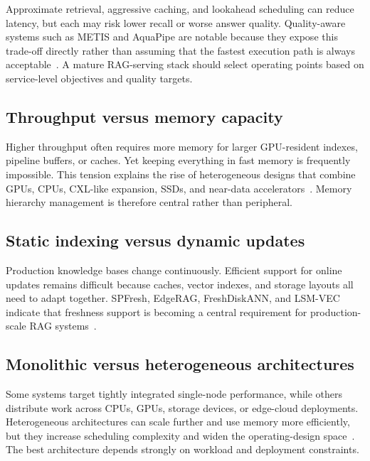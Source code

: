\documentclass[acmsmall,screen]{acmart}
\begin{document}
Approximate retrieval, aggressive caching, and lookahead scheduling can reduce latency, but each may risk lower recall or worse answer quality. Quality-aware systems such as METIS and AquaPipe are notable because they expose this trade-off directly rather than assuming that the fastest execution path is always acceptable~\cite{metis2025,aquapipe2025}. A mature RAG-serving stack should select operating points based on service-level objectives and quality targets.

\subsection{Throughput versus memory capacity}

Higher throughput often requires more memory for larger GPU-resident indexes, pipeline buffers, or caches. Yet keeping everything in fast memory is frequently impossible. This tension explains the rise of heterogeneous designs that combine GPUs, CPUs, CXL-like expansion, SSDs, and near-data accelerators~\cite{chameleon2025,diskann2019,smartssd2024}. Memory hierarchy management is therefore central rather than peripheral.

\subsection{Static indexing versus dynamic updates}

Production knowledge bases change continuously. Efficient support for online updates remains difficult because caches, vector indexes, and storage layouts all need to adapt together. SPFresh, EdgeRAG, FreshDiskANN, and LSM-VEC indicate that freshness support is becoming a central requirement for production-scale RAG systems~\cite{spfresh2023,edgerag2024,freshdiskann2021,lsmvec2025}.

\subsection{Monolithic versus heterogeneous architectures}

Some systems target tightly integrated single-node performance, while others distribute work across CPUs, GPUs, storage devices, or edge-cloud deployments. Heterogeneous architectures can scale further and use memory more efficiently, but they increase scheduling complexity and widen the operating-design space~\cite{ragdoll2025,dgrag2025,chameleon2025}. The best architecture depends strongly on workload and deployment constraints.
\end{document}
